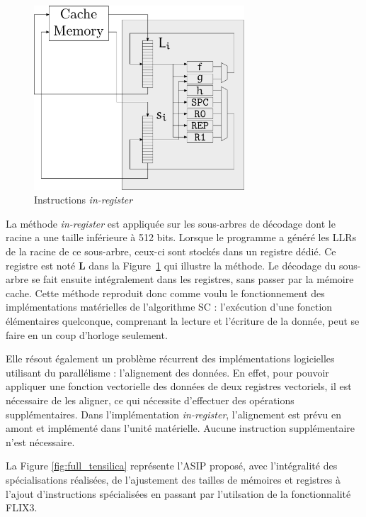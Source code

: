 \begin{figure}[t]
\centering
\includegraphics[width=0.7\textwidth]{main/ch3_fig/in_register}
\caption{Instructions \textit{in-register}}
\label{fig:in-register}
\end{figure}

La méthode \textit{in-register} est appliquée sur les sous-arbres de décodage dont le \noeud racine a une taille inférieure à 512 bits.
Lorsque le programme a généré les LLRs de la racine de ce sous-arbre, ceux-ci sont stockés dans un registre dédié.
Ce registre est noté $\mathbold{L}$ dans la Figure~\ref{fig:in-register} qui illustre la méthode.
Le décodage du sous-arbre se fait ensuite intégralement dans les registres, sans passer par la mémoire cache.
Cette méthode reproduit donc comme voulu le fonctionnement des implémentations matérielles de l'algorithme SC : l'exécution d'une fonction élémentaires quelconque, comprenant la lecture et l'écriture de la donnée, peut se faire en un coup d'horloge seulement.

Elle résout également un problème récurrent des implémentations logicielles utilisant du parallélisme : l'alignement des données. En effet, pour pouvoir appliquer une fonction vectorielle des données de deux registres vectoriels, il est nécessaire de les aligner, ce qui nécessite d'effectuer des opérations supplémentaires. Dans l'implémentation \textit{in-register}, l'alignement est prévu en amont et implémenté dans l'unité matérielle. Aucune instruction supplémentaire n'est nécessaire. 

La Figure \ref{fig:full_tensilica} représente l'ASIP proposé, avec l'intégralité des spécialisations réalisées, de l'ajustement des tailles de mémoires et registres à l'ajout d'instructions spécialisées en passant par l'utilsation de la fonctionnalité FLIX3.

